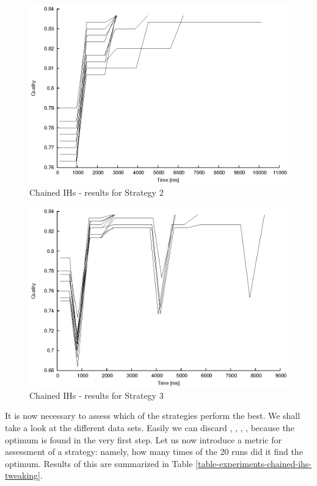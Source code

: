 \begin{figure}
  \caption{Chained IHs -  results for Strategy 2}
  \label{image-experiment-chained-ihs-s2}
  \centering
    \includegraphics[width=\textwidth]{images/experiments/chained-ihs-s2}
\end{figure}

\begin{figure}
  \caption{Chained IHs -  results for Strategy 3}
  \label{image-experiment-chained-ihs-s3}
  \centering
    \includegraphics[width=\textwidth]{images/experiments/chained-ihs-s3}
\end{figure}

It is now necessary to assess which of the strategies perform the best. We shall take a look at the different data sets. Easily we can discard , , , , because the optimum is found in the very first step. Let us now introduce a metric for assessment of a strategy: namely, how many times of the 20 runs did it find the optimum. Results of this are summarized in Table \ref{table-experiments-chained-ihs-tweaking}.

